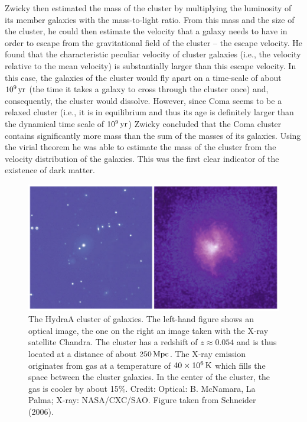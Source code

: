 \documentclass[a4paper,11pt]{article}
\begin{document}
{\noindent}Zwicky then estimated the mass of the cluster by multiplying the luminosity of its member galaxies with the mass-to-light ratio. From this mass and the size of the cluster, he could then estimate the velocity that a galaxy needs to have in order to escape from the gravitational field of the cluster -- the escape velocity. He found that the characteristic peculiar velocity of cluster galaxies (i.e., the velocity relative to the mean velocity) is substantially larger than this escape velocity. In this case, the galaxies of the cluster would fly apart on a time-scale of about $10^9\,{\rm yr}$ (the time it takes a galaxy to cross through the cluster once) and, consequently, the cluster would dissolve. However, since Coma seems to be a relaxed cluster (i.e., it is in equilibrium and thus its age is definitely larger than the dynamical time scale of $10^9\,{\rm yr}$) Zwicky concluded that the Coma cluster contains significantly more mass than the sum of the masses of its galaxies. Using the virial theorem he was able to estimate the mass of the cluster from the velocity distribution of the galaxies. This was the first clear indicator of the existence of dark matter.

\begin{figure}[h]
    \centering
    \includegraphics[width=14cm]{figures/HydraA.png}
    \caption{\footnotesize{The HydraA cluster of galaxies. The left-hand figure shows an optical image, the one on the right an image taken with the X-ray satellite Chandra. The cluster has a redshift of $z\approx0.054$ and is thus located at a distance of about $250\,{\rm Mpc}$. The X-ray emission originates from gas at a temperature of $40\times10^6\,{\rm K}$ which fills the space between the cluster galaxies. In the center of the cluster, the gas is cooler by about 15\%. Credit: Optical: B. McNamara, La Palma; X-ray: NASA/CXC/SAO. Figure taken from Schneider (2006).}}
    \label{fig:hydraa}
\end{figure}
\end{document}
